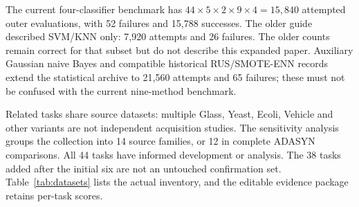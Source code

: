 \documentclass[conference]{IEEEtran}
\begin{document}
The current four-classifier benchmark has $44\times5\times2\times9\times4=15{,}840$ attempted outer evaluations, with 52 failures and 15,788 successes. The older guide described SVM/KNN only: 7,920 attempts and 26 failures. The older counts remain correct for that subset but do not describe this expanded paper. Auxiliary Gaussian naive Bayes and compatible historical RUS/SMOTE-ENN records extend the statistical archive to 21,560 attempts and 65 failures; these must not be confused with the current nine-method benchmark.

Related tasks share source datasets: multiple Glass, Yeast, Ecoli, Vehicle and other variants are not independent acquisition studies. The sensitivity analysis groups the collection into 14 source families, or 12 in complete ADASYN comparisons. All 44 tasks have informed development or analysis. The 38 tasks added after the initial six are not an untouched confirmation set. Table~\ref{tab:datasets} lists the actual inventory, and the editable evidence package retains per-task scores.
\end{document}
